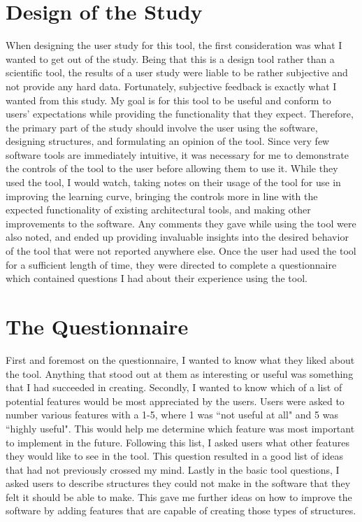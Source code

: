 \documentclass{thesis}
\begin{document}
\section{Design of the Study}
When designing the user study for this tool, the first consideration was what I wanted to get out of the study.  Being that this is
a design tool rather than a scientific tool, the results of a user study were liable to be rather subjective and not provide any hard
data.  Fortunately, subjective feedback is exactly what I wanted from this study.  My goal is for this tool to be useful and conform
to users' expectations while providing the functionality that they expect.  Therefore, the primary part of the study should involve the
user using the software, designing structures, and formulating an opinion of the tool.  Since very few software tools are immediately
intuitive, it was necessary for me to demonstrate the controls of the tool to the user before allowing them to use it.  While they used
the tool, I would watch, taking notes on their usage of the tool for use in improving the learning curve, bringing the controls
more in line with the expected functionality of existing architectural tools, and making other improvements to the software.  Any
comments they gave while using the tool were also noted, and ended up providing invaluable insights into the desired behavior of the
tool that were not reported anywhere else.  Once the user had used the tool for a sufficient length of time, they were directed to
complete a questionnaire which contained questions I had about their experience using the tool.

\section{The Questionnaire}
First and foremost on the questionnaire, I wanted to know what they liked about the tool.  Anything that stood out at them as
interesting or useful was something that I had succeeded in creating.  Secondly, I wanted to know which of a list
of potential features would be most appreciated by the users.  Users were asked to number various features with a 1-5, where
1 was ``not useful at all" and 5 was ``highly useful".  This would help me determine which feature was most important to
implement in the future.  Following this list, I asked users what other features they would like to see in the tool.  This
question resulted in a good list of ideas that had not previously crossed my mind.  Lastly in the basic tool questions, I
asked users to describe structures they could not make in the software that they felt it should be able to make.  This gave
me further ideas on how to improve the software by adding features that are capable of creating those types of structures.
\end{document}

